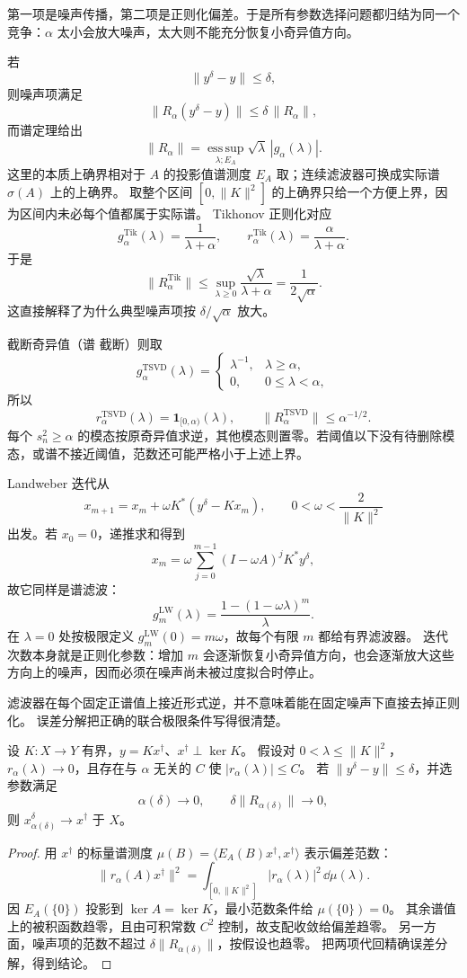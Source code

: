第一项是噪声传播，第二项是正则化偏差。于是所有参数选择问题都归结为同一个竞争：$\alpha$ 太小会放大噪声，太大则不能充分恢复小奇异值方向。

若
\[
\|y^\delta-y\|\le\delta,
\]
则噪声项满足
\[
\|R_\alpha(y^\delta-y)\|
\le
\delta\,\|R_\alpha\|,
\]
而谱定理给出
\[
\boxed{
\|R_\alpha\|
=
\operatorname*{ess\,sup}_{\lambda;E_A}
\sqrt\lambda\,|g_\alpha(\lambda)|
}.
\]
这里的本质上确界相对于 $A$ 的投影值谱测度 $E_A$ 取；连续滤波器可换成实际谱 $\sigma(A)$ 上的上确界。
取整个区间 $[0,\|K\|^2]$ 的上确界只给一个方便上界，因为区间内未必每个值都属于实际谱。
Tikhonov 正则化对应
\[
g_\alpha^{\mathrm{Tik}}(\lambda)
=\frac{1}{\lambda+\alpha},
\qquad
r_\alpha^{\mathrm{Tik}}(\lambda)
=\frac{\alpha}{\lambda+\alpha}.
\]
于是
\[
\|R_\alpha^{\mathrm{Tik}}\|
\le\sup_{\lambda\ge0}\frac{\sqrt\lambda}{\lambda+\alpha}
=\frac{1}{2\sqrt\alpha}.
\]
这直接解释了为什么典型噪声项按 $\delta/\sqrt\alpha$ 放大。

截断奇异值（谱 截断）则取
\[
g_\alpha^{\mathrm{TSVD}}(\lambda)
=\begin{cases}
\lambda^{-1},&\lambda\ge\alpha,\\
0,&0\le\lambda<\alpha,
\end{cases}
\]
所以
\[
r_\alpha^{\mathrm{TSVD}}(\lambda)
=\mathbf 1_{[0,\alpha)}(\lambda),
\qquad
\|R_\alpha^{\mathrm{TSVD}}\|\le\alpha^{-1/2}.
\]
每个 $s_n^2\ge\alpha$ 的模态按原奇异值求逆，其他模态则置零。若阈值以下没有待删除模态，或谱不接近阈值，范数还可能严格小于上述上界。

Landweber 迭代从
\[
x_{m+1}=x_m+\omega K^*(y^\delta-Kx_m),
\qquad
0<\omega<\frac{2}{\|K\|^2}
\]
出发。若 $x_0=0$，递推求和得到
\[
x_m
=\omega\sum_{j=0}^{m-1}(I-\omega A)^jK^*y^\delta,
\]
故它同样是谱滤波：
\[
\boxed{
g_m^{\mathrm{LW}}(\lambda)
=\frac{1-(1-\omega\lambda)^m}{\lambda}}.
\]
在 $\lambda=0$ 处按极限定义 $g_m^{\mathrm{LW}}(0)=m\omega$，故每个有限 $m$ 都给有界滤波器。
迭代次数本身就是正则化参数：增加 $m$ 会逐渐恢复小奇异值方向，也会逐渐放大这些方向上的噪声，因而必须在噪声尚未被过度拟合时停止。

滤波器在每个固定正谱值上接近形式逆，并不意味着能在固定噪声下直接去掉正则化。
误差分解把正确的联合极限条件写得很清楚。

\begin{theorem}[谱滤波恢复最小范数解的条件]
设 $K:X\to Y$ 有界，$y=Kx^\dagger$、$x^\dagger\perp\ker K$。
假设对 $0<\lambda\le\|K\|^2$，$r_\alpha(\lambda)\to0$，且存在与 $\alpha$ 无关的 $C$ 使 $|r_\alpha(\lambda)|\le C$。
若 $\|y^\delta-y\|\le\delta$，并选参数满足
\[
\alpha(\delta)\longrightarrow0,\qquad
\delta\|R_{\alpha(\delta)}\|\longrightarrow0,
\]
则 $x_{\alpha(\delta)}^\delta\to x^\dagger$ 于 $X$。
\end{theorem}
\begin{proof}
用 $x^\dagger$ 的标量谱测度 $\mu(B)=\langle E_A(B)x^\dagger,x^\dagger\rangle$ 表示偏差范数：
\[
\|r_\alpha(A)x^\dagger\|^2
=\int_{[0,\|K\|^2]}|r_\alpha(\lambda)|^2\,\dd\mu(\lambda).
\]
因 $E_A(\{0\})$ 投影到 $\ker A=\ker K$，最小范数条件给 $\mu(\{0\})=0$。
其余谱值上的被积函数趋零，且由可积常数 $C^2$ 控制，故支配收敛给偏差趋零。
另一方面，噪声项的范数不超过 $\delta\|R_{\alpha(\delta)}\|$，按假设也趋零。
把两项代回精确误差分解，得到结论。
\end{proof}

